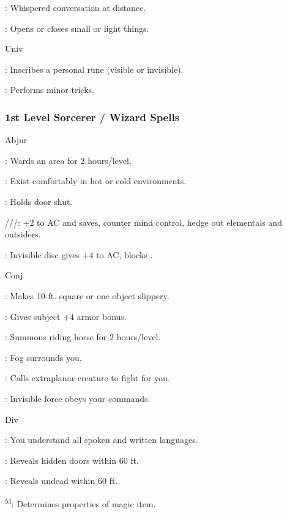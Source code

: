 : Whispered conversation at distance.

: Opens or closes small or light things.

Univ

: Inscribes a personal rune (visible or invisible).

: Performs minor tricks.

\subsubsection{1st Level Sorcerer / Wizard Spells}

Abjur

: Wards an area for 2 hours/level.

: Exist comfortably in hot or cold environments.

: Holds door shut.

///: +2 to AC and saves, counter mind control, hedge out elementals and outsiders.

: Invisible disc gives +4 to AC, blocks .

Conj

: Makes 10-ft. square or one object slippery.

: Gives subject +4 armor bonus.

: Summons riding horse for 2 hours/level.

: Fog surrounds you.

: Calls extraplanar creature to fight for you.

: Invisible force obeys your commands.

Div

: You understand all spoken and written languages.

: Reveals hidden doors within 60 ft.

: Reveals undead within 60 ft.

\textsuperscript{M}: Determines properties of magic item.

